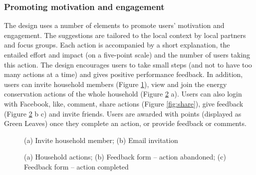 \subsubsection{Promoting motivation and engagement} 
The design uses a number of elements to promote users' motivation and engagement. 
The suggestions are tailored to the local context by local partners and focus groups. 
Each action is accompanied by a short explanation, the entailed effort and impact (on a five-point scale) and the number of users taking this action. 
The design encourages users to take small steps (and not to have too many actions at a time) and gives positive performance feedback. 
In addition, users can invite household members  (Figure \ref{fig:invite}), view and join the energy conservation actions of the whole household (Figure \ref{fig:form} a).
Users can also login with Facebook, like, comment, share actions (Figure \ref{fig:share}), give feedback (Figure \ref{fig:form} b c) and invite friends. Users are awarded with points  (displayed as Green Leaves) once they complete an action, or provide feedback or comments. 




\begin{figure}
      \begin{center}
        \begin{minipage}[t!]{0.33\linewidth}
        \end{minipage}
        \begin{minipage}[t!]{0.65\linewidth}    
        \end{minipage}
      \end{center}
      \caption{(a) Invite household member; (b) Email invitation}\label{fig:invite}
\end{figure}


\begin{figure}
      \begin{center}
      \begin{minipage}[t!]{0.33\linewidth}    
       \end{minipage}
        \begin{minipage}[t!]{0.33\linewidth}
        \end{minipage}
        \begin{minipage}[t!]{0.31\linewidth}
                \end{minipage}
      \end{center}
      \caption{(a) Household actions; (b) Feedback form -- action abandoned; (c) Feedback form -- action completed}\label{fig:form}
\end{figure}


